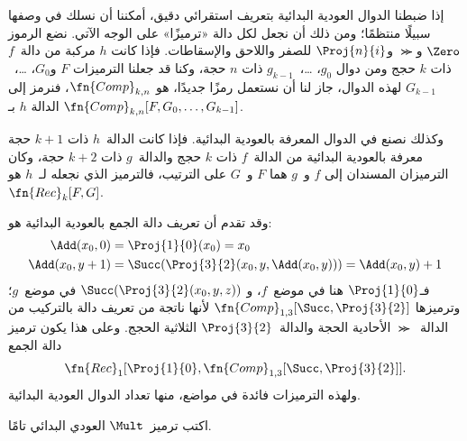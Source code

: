 \documentclass[../../../include/open-logic-section]{subfiles}
\begin{document}

إذا ضبطنا الدوال العودية البدائية بتعريف استقرائي دقيق، أمكننا أن نسلك
في وصفها سبيلًا منتظمًا؛ ومن ذلك أن نجعل لكل دالة «ترميزًا» على
الوجه الآتي. نضع الرموز $\Zero$ و$\Succ$ و$\Proj{n}{i}$ للصفر
واللاحق والإسقاطات. فإذا كانت $h$ مركبة من دالة~$f$ ذات
$k$ حجج ومن دوال $g_0$، …،~$g_{k-1}$ ذات $n$ حجة، وكنا قد جعلنا
الترميزات $F$ و$G_0$، …،~$G_{k-1}$ لهذه الدوال، جاز لنا
أن نستعمل رمزًا جديدًا، هو $\fn{Comp}_{k,n}$، فنرمز إلى الدالة $h$ بـ
$\fn{Comp}_{k,n}[F,G_0,\dots,G_{k-1}]$.

وكذلك نصنع في الدوال المعرفة بالعودية البدائية. فإذا
كانت الدالة~$h$ ذات $k+1$ حجة معرفة بالعودية البدائية من الدالة~$f$ ذات
$k$ حجج والدالة~$g$ ذات $k+2$ حجة، وكان الترميزان المسندان إلى $f$
و~$g$ هما $F$ و~$G$ على الترتيب، فالترميز الذي نجعله لـ~$h$ هو
$\fn{Rec}_k[F,G]$.

وقد تقدم أن تعريف دالة الجمع بالعودية البدائية هو:
\begin{align*}
  \Add(x_0, 0) & = \Proj{1}{0}(x_0) = x_0\\
  \Add(x_0, y+1) & = \Succ(\Proj{3}{2}(x_0, y, \Add(x_0, y))) = \Add(x_0, y) +1
\end{align*}
فـ$\Proj{1}{0}$ هنا في موضع~$f$، و
$\Succ(\Proj{3}{2}(x_0,y,z))$ في موضع~$g$؛ وترميزها
$\fn{Comp}_{1,3}[\Succ,\Proj{3}{2}]$ لأنها ناتجة من تعريف دالة
بالتركيب من الدالة~$\Succ$ الأحادية الحجة والدالة~$\Proj{3}{2}$
الثلاثية الحجج. وعلى هذا يكون ترميز دالة الجمع
\[
\fn{Rec}_1[\Proj{1}{0},\fn{Comp}_{1,3}[\Succ,\Proj{3}{2}]].
\]
ولهذه الترميزات فائدة في مواضع، منها تعداد الدوال العودية البدائية.

\begin{prob}
  اكتب ترميز~$\Mult$ العودي البدائي تامًا.
\end{prob}
\end{document}
